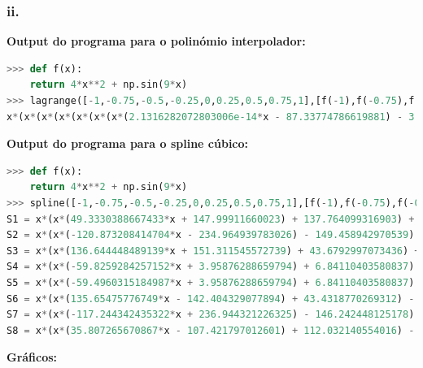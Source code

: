 \documentclass{article}
\begin{document}
\subsubsection*{ii.}
\textbf{Output do programa para o polinómio interpolador:}
\begin{lstlisting}[language=Python]
>>> def f(x):
    return 4*x**2 + np.sin(9*x)
>>> lagrange([-1,-0.75,-0.5,-0.25,0,0.25,0.5,0.75,1],[f(-1),f(-0.75),f(-0.5),f(-0.25),f(0),f(0.25),f(0.5),f(0.75),f(1)])
x*(x*(x*(x*(x*(x*(x*(2.1316282072803006e-14*x - 87.33774786619881) - 3.7636560534792807e-14) + 146.82505656270518) + 1.6958656701149266e-14) - 65.7442883348996) + 3.9999999999999975) + 6.6690981236349886)
\end{lstlisting}
\textbf{Output do programa para o spline cúbico:}
\begin{lstlisting}[language=Python]
>>> def f(x):
    return 4*x**2 + np.sin(9*x)
>>> spline([-1,-0.75,-0.5,-0.25,0,0.25,0.5,0.75,1],[f(-1),f(-0.75),f(-0.5),f(-0.25),f(0),f(0.25),f(0.5),f(0.75),f(1)])
S1 = x*(x*(49.3330388667433*x + 147.99911660023) + 137.764099316903) + 42.6859030981746
S2 = x*(x*(-120.873208414704*x - 234.964939783026) - 149.458942970539) - 29.1198574736858
S3 = x*(x*(136.644448489139*x + 151.311545572739) + 43.6792997073436) + 3.0698496392946
S4 = x*(x*(-59.8259284257152*x + 3.95876288659794) + 6.84110403580837)
S5 = x*(x*(-59.4960315184987*x + 3.95876288659794) + 6.84110403580837)
S6 = x*(x*(135.65475776749*x - 142.404329077894) + 43.4318770269312) - 3.04923108259357
S7 = x*(x*(-117.244342435322*x + 236.944321226325) - 146.242448125178) + 28.5631564427579
S8 = x*(x*(35.807265670867*x - 107.421797012601) + 112.032140554016) - 36.0054907270406
\end{lstlisting}
\textbf{Gráficos:}
\end{document}
